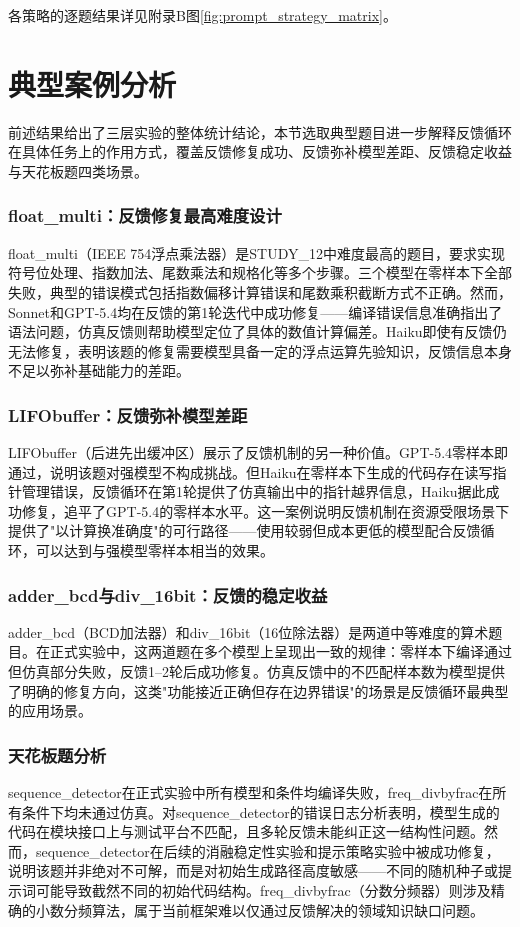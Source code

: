 各策略的逐题结果详见附录B图\ref{fig:prompt_strategy_matrix}。

\section{典型案例分析}

前述结果给出了三层实验的整体统计结论，本节选取典型题目进一步解释反馈循环在具体任务上的作用方式，覆盖反馈修复成功、反馈弥补模型差距、反馈稳定收益与天花板题四类场景。

\subsubsection*{float\_multi：反馈修复最高难度设计}
float\_multi（IEEE 754浮点乘法器）是STUDY\_12中难度最高的题目，要求实现符号位处理、指数加法、尾数乘法和规格化等多个步骤。三个模型在零样本下全部失败，典型的错误模式包括指数偏移计算错误和尾数乘积截断方式不正确。然而，Sonnet和GPT-5.4均在反馈的第1轮迭代中成功修复——编译错误信息准确指出了语法问题，仿真反馈则帮助模型定位了具体的数值计算偏差。Haiku即使有反馈仍无法修复，表明该题的修复需要模型具备一定的浮点运算先验知识，反馈信息本身不足以弥补基础能力的差距。

\subsubsection*{LIFObuffer：反馈弥补模型差距}
LIFObuffer（后进先出缓冲区）展示了反馈机制的另一种价值。GPT-5.4零样本即通过，说明该题对强模型不构成挑战。但Haiku在零样本下生成的代码存在读写指针管理错误，反馈循环在第1轮提供了仿真输出中的指针越界信息，Haiku据此成功修复，追平了GPT-5.4的零样本水平。这一案例说明反馈机制在资源受限场景下提供了"以计算换准确度"的可行路径——使用较弱但成本更低的模型配合反馈循环，可以达到与强模型零样本相当的效果。

\subsubsection*{adder\_bcd与div\_16bit：反馈的稳定收益}
adder\_bcd（BCD加法器）和div\_16bit（16位除法器）是两道中等难度的算术题目。在正式实验中，这两道题在多个模型上呈现出一致的规律：零样本下编译通过但仿真部分失败，反馈1--2轮后成功修复。仿真反馈中的不匹配样本数为模型提供了明确的修复方向，这类"功能接近正确但存在边界错误"的场景是反馈循环最典型的应用场景。

\subsubsection*{天花板题分析}
sequence\_detector在正式实验中所有模型和条件均编译失败，freq\_divbyfrac在所有条件下均未通过仿真。对sequence\_detector的错误日志分析表明，模型生成的代码在模块接口上与测试平台不匹配，且多轮反馈未能纠正这一结构性问题。然而，sequence\_detector在后续的消融稳定性实验和提示策略实验中被成功修复，说明该题并非绝对不可解，而是对初始生成路径高度敏感——不同的随机种子或提示词可能导致截然不同的初始代码结构。freq\_divbyfrac（分数分频器）则涉及精确的小数分频算法，属于当前框架难以仅通过反馈解决的领域知识缺口问题。

